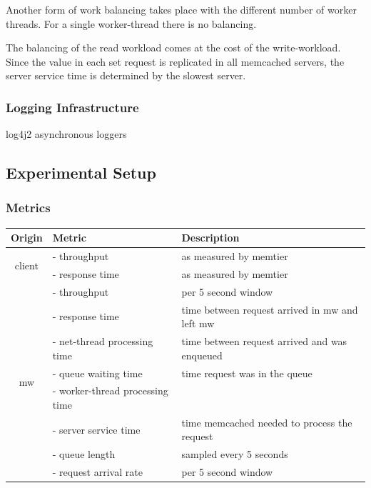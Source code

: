 \documentclass[11pt,a4paper]{article}
\newcommand\Tstrut{\rule{0pt}{2.6ex}}       %
\begin{document}
Another form of work balancing takes place with the different number of worker threads. For a single worker-thread there is no balancing. 

The balancing of the read workload comes at the cost of the write-workload. Since the value in each set request is replicated in all memcached servers, the server service time is determined by the slowest server. 


\subsubsection{Logging Infrastructure}

log4j2 asynchronous loggers


\subsection{Experimental Setup}

\subsubsection{Metrics}\label{measured-points}



\begin{tabular}{|c|l|l|}
	\hline 
	\textbf{Origin} & \textbf{Metric} & \textbf{Description} \Tstrut \\ 
	\hline 
	\multirow{2}{*}{client} & - throughput & as measured by memtier \Tstrut \\ 
	& - response time & as measured by memtier \\ 
	\hline 
	\multirow{8}{*}{mw} & - throughput & per 5 second window \Tstrut \\ 
	& - response time & time between request arrived in mw and left mw\\ 
	& - net-thread processing time & time between request arrived and was enqueued\\  
	& - queue waiting time & time request was in the queue \\ 
	& - worker-thread processing time &  \\ 
	& - server service time & time memcached needed to process the request\\  
	& - queue length & sampled every 5 seconds \\  
	& - request arrival rate & per 5 second window \\ 
	\hline 
\end{tabular} 
\end{document}
